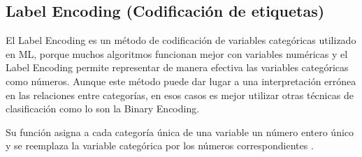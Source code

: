 \begin{table}[H]
\centering
\setlength{\tabcolsep}{5pt}
\caption{Binary Encoding con las variables que actualmente poseen dos estados activos}
\label{tab:Binary encoding}
\end{table}
        
    \hypertarget{label-encoding-codificaciuxf3n-de-etiquetas}{%
\subsection{Label Encoding (Codificación de etiquetas)}\label{label-encoding-codificaciuxf3n-de-etiquetas}}

El Label Encoding es un método de codificación de variables categóricas utilizado en ML, porque muchos algoritmos funcionan mejor con variables numéricas y el Label Encoding permite representar de manera efectiva las variables categóricas como números. Aunque este método puede dar lugar a una interpretación errónea en las relaciones entre categorías, en esos casos es mejor utilizar otras técnicas de clasificación como lo son la Binary Encoding.
\par Su función asigna a cada categoría única de una variable un número entero único y se reemplaza la variable categórica por los números correspondientes \cite{Hancock2020}.

